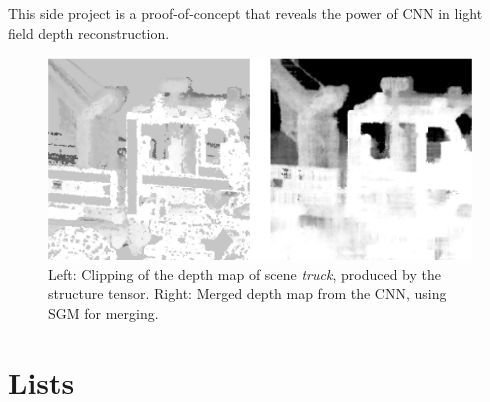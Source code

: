 \documentclass  [
  paper    = a4,
  BCOR     = 10mm,
  twoside,
  fontsize = 12pt,
  fleqn,
  toc      = bibnumbered,
  toc      = listofnumbered,
  numbers  = noendperiod,
  headings = normal,
  listof   = leveldown,
  version  = 3.03
]                                       {scrreprt}
\begin{document}
\begin{appendix}
This side project is a proof-of-concept that reveals the power of CNN in light field depth reconstruction.
\begin{figure}[h!]
	\centering
	\includegraphics[width=0.7\linewidth]{images/truck_cnndata}
	\caption[Truck with CNN +SGM]{Left: Clipping of the depth map of scene \textit{truck}, produced by the structure tensor. Right: Merged depth map from the CNN, using SGM for merging. }
	\label{fig:depthcnntruck}
\end{figure}

\end{appendix}
\chapter{Lists}
\listoffigures
\listoftables
{}
{}


    
\end{document}

